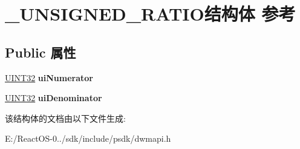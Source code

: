 \hypertarget{struct___u_n_s_i_g_n_e_d___r_a_t_i_o}{}\section{\+\_\+\+U\+N\+S\+I\+G\+N\+E\+D\+\_\+\+R\+A\+T\+I\+O结构体 参考}
\label{struct___u_n_s_i_g_n_e_d___r_a_t_i_o}
\subsection*{Public 属性}
\begin{DoxyCompactItemize}
\item 
\mbox{\label{struct___u_n_s_i_g_n_e_d___r_a_t_i_o_a73177c433c45f9f85866146de0841794}} 
\hyperlink{_processor_bind_8h_ae1e6edbbc26d6fbc71a90190d0266018}{U\+I\+N\+T32} {\bfseries ui\+Numerator}
\item 
\mbox{\label{struct___u_n_s_i_g_n_e_d___r_a_t_i_o_ad7031c2c187ce731326899294c9ec1ec}} 
\hyperlink{_processor_bind_8h_ae1e6edbbc26d6fbc71a90190d0266018}{U\+I\+N\+T32} {\bfseries ui\+Denominator}
\end{DoxyCompactItemize}


该结构体的文档由以下文件生成\+:\begin{DoxyCompactItemize}
\item 
E\+:/\+React\+O\+S-\/0../sdk/include/psdk/dwmapi.\+h\end{DoxyCompactItemize}
